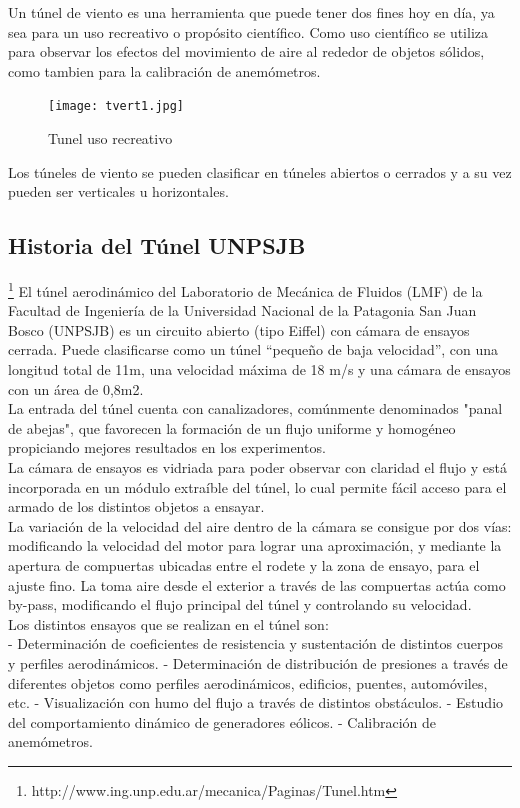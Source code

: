 
Un túnel de viento es una herramienta que puede tener dos fines hoy en día, ya sea para un uso recreativo o propósito científico.
Como uso científico se utiliza para observar los efectos del movimiento de aire al rededor de objetos sólidos, como tambien para la calibración de anemómetros.
\begin{figure}[htb]
	\centering
	\texttt{[image: tvert1.jpg]}
	\caption{Tunel uso recreativo}
	\label{fig:tunelRec}
	\end{figure}
Los túneles de viento se pueden clasificar en túneles abiertos o cerrados y a su vez pueden ser verticales u horizontales.

\subsection{Historia del Túnel UNPSJB}
\footnote{http://www.ing.unp.edu.ar/mecanica/Paginas/Tunel.htm} 
	El túnel aerodinámico del Laboratorio de Mecánica de Fluidos (LMF) de la Facultad de Ingeniería de la Universidad Nacional de la Patagonia San Juan Bosco (UNPSJB) es un circuito abierto (tipo Eiffel) con cámara de ensayos cerrada. Puede clasificarse como un túnel “pequeño de baja velocidad”, con una longitud total de 11m, una velocidad máxima de 18 m/s y una cámara de ensayos con un área de 0,8m2.
	\\
	La entrada del túnel cuenta con canalizadores, comúnmente denominados "panal de abejas", que favorecen la formación de un flujo uniforme y homogéneo propiciando mejores resultados en los experimentos.
	\\
	La cámara de ensayos es vidriada para poder observar con claridad el flujo y está incorporada en un módulo extraíble del túnel, lo cual permite fácil acceso para el armado de los distintos objetos a ensayar.
	\\
	La variación de la velocidad del aire dentro de la cámara se consigue por dos vías: modificando la velocidad del motor para lograr una aproximación, y mediante la apertura de compuertas ubicadas entre el rodete y la zona de ensayo, para el ajuste fino. La toma aire desde el exterior a través de las compuertas actúa como by-pass, modificando el flujo principal del túnel y controlando su velocidad.
	\\
	Los distintos ensayos que se realizan en el túnel son:
	\\
	- Determinación de coeficientes de resistencia y sustentación de distintos cuerpos y perfiles aerodinámicos.
	- Determinación de distribución de presiones a través de diferentes objetos como perfiles aerodinámicos, edificios, puentes, automóviles, etc.
	- Visualización con humo del flujo a través de distintos obstáculos.
	- Estudio del comportamiento dinámico de generadores eólicos.
	- Calibración de anemómetros. 

